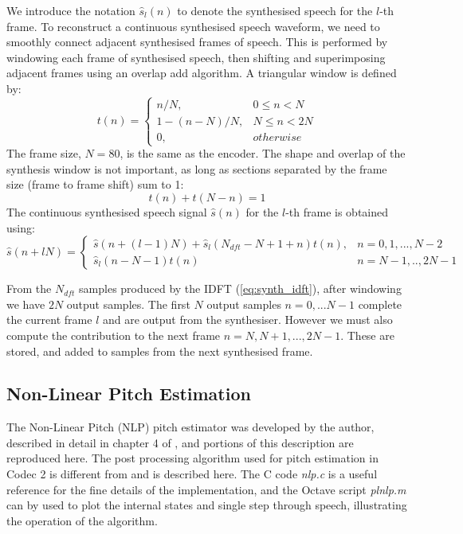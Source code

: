\documentclass{article}
\begin{document}
{We introduce the notation $\hat{s}_l(n)$ to denote the synthesised speech for the $l$-th frame. To reconstruct a continuous synthesised speech waveform, we need to smoothly connect adjacent synthesised frames of speech. This is performed by windowing each frame of synthesised speech, then shifting and superimposing adjacent frames using an overlap add algorithm. A triangular window is defined by:
\begin{equation}
t(n) = \begin{cases}
          n/N,         & 0 \le n < N  \\
          1 - (n-N)/N, & N \le n < 2N \\ 
          0,           & otherwise
       \end{cases}
\end{equation}
The frame size, $N=80$, is the same as the encoder. The shape and overlap of the synthesis window is not important, as long as sections separated by the frame size (frame to frame shift) sum to 1:
\begin{equation}
t(n) + t(N-n) = 1
\end{equation}
The continuous synthesised speech signal $\hat{s}(n)$ for the $l$-th frame is obtained using:
\begin{equation}
\hat{s}(n+lN) = \begin{cases}
                    \hat{s}(n+(l-1)N) + \hat{s}_l(N_{dft}-N+1+n)t(n), & n=0,1,...,N-2 \\ 
		            \hat{s}_l(n - N - 1)t(n)                                    & n=N-1,..,2N-1
                  \end{cases}
\end{equation}

From the $N_{dft}$ samples produced by the IDFT (\ref{eq:synth_idft}), after windowing we have $2N$ output samples. The first $N$ output samples $n=0,...N-1$ complete the current frame $l$ and are output from the synthesiser.  However we must also compute the contribution to the next frame $n = N,N+1,...,2N-1$.  These are stored, and added to samples from the next synthesised frame.

\subsection{Non-Linear Pitch Estimation}
\label{sect:nlp}

The Non-Linear Pitch (NLP) pitch estimator was developed by the author, described in detail in chapter 4 of \cite{rowe1997techniques}, and portions of this description are reproduced here.  The post processing algorithm used for pitch estimation in Codec 2 is different from \cite{rowe1997techniques} and is described here.  The C code \emph{nlp.c} is a useful reference for the fine details of the implementation, and the Octave script \emph{plnlp.m} can by used to plot the internal states and single step through speech, illustrating the operation of the algorithm.

}
\end{document}
